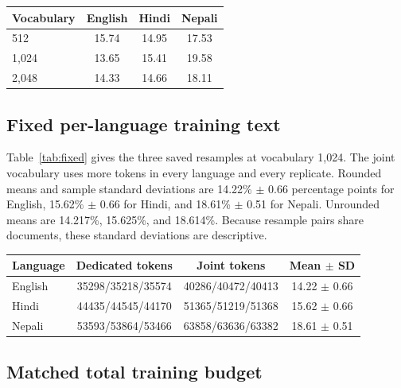 \documentclass[10pt,twocolumn]{article}
\begin{document}
\begin{center}
\small
\begin{tabular}{@{}lccc@{}}
\toprule
Vocabulary & English & Hindi & Nepali \\
\midrule
512 & 15.74 & 14.95 & 17.53 \\
1{,}024 & 13.65 & 15.41 & 19.58 \\
2{,}048 & 14.33 & 14.66 & 18.11 \\
\bottomrule
\end{tabular}
\label{tab:sweep}
\end{center}

\subsection{Fixed per-language training text}

Table~\ref{tab:fixed} gives the three saved resamples at vocabulary 1{,}024.
The joint vocabulary uses more tokens in every language and every replicate.
Rounded means and sample standard deviations are 14.22\% $\pm$ 0.66 percentage points for English, 15.62\% $\pm$ 0.66 for Hindi, and 18.61\% $\pm$ 0.51 for Nepali.
Unrounded means are 14.217\%, 15.625\%, and 18.614\%.
Because resample pairs share documents, these standard deviations are descriptive.

\begin{center}
\footnotesize
\setlength{\tabcolsep}{3pt}
\begin{tabular}{@{}lccc@{}}
\toprule
Language & Dedicated tokens & Joint tokens & Mean $\pm$ SD \\
\midrule
English & 35298/35218/35574 & 40286/40472/40413 & 14.22 $\pm$ 0.66 \\
Hindi & 44435/44545/44170 & 51365/51219/51368 & 15.62 $\pm$ 0.66 \\
Nepali & 53593/53864/53466 & 63858/63636/63382 & 18.61 $\pm$ 0.51 \\
\bottomrule
\end{tabular}
\label{tab:fixed}
\end{center}

\subsection{Matched total training budget}
\end{document}

